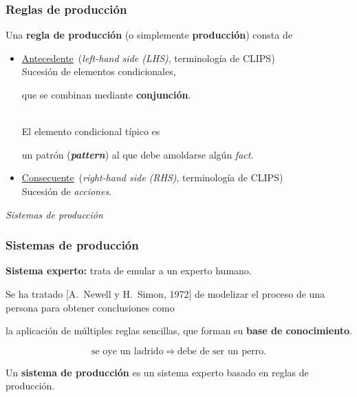 \documentclass{beamer}    %
\begin{document}
\begin{frame}
 \frametitle{Reglas de producción}

 Una {\bf regla de producción} (o simplemente {\bf
   producción}) consta de
 \begin{itemize}
 \item \underline{Antecedente}\hfill
  (\emph{left-hand side (LHS)}, terminología de CLIPS)\\[2mm]

 Sucesión de elementos condicionales,\\[1mm]
 \hfill\parbox{.85\linewidth}{que se combinan mediante {\bf
     conjunción}.}\\[2mm]

 El elemento condicional típico es\\[1mm]
 \hfill\parbox{.85\linewidth}{un patrón ({\bf \emph{pattern}})
   al que debe amoldarse algún \emph{fact}.}
 \vspace{5mm}

 \item \underline{Consecuente}\hfill
  (\emph{right-hand side (RHS)}, terminología de CLIPS)\\[2mm]

 Sucesión de \emph{acciones}.
 \end{itemize}
\end{frame}

\begin{frame}
\centerline{\emph{Sistemas de producción}}
\end{frame}

\begin{frame}
 \frametitle{Sistemas de producción}

 {\bf Sistema experto:} trata de emular a un experto humano.
 \vspace{4mm}

 Se ha tratado [{\sc A. Newell} y {\sc H. Simon}, 1972] de
 modelizar el proceso de una persona para obtener
 conclusiones como\\[2mm] \hfill\parbox{.85\linewidth}{la
   aplicación de múltiples reglas sencillas, que forman su
   {\bf base de conocimiento}.}
 \[\mbox{se oye un ladrido}
   \ \Rightarrow\ 
   \mbox{debe de ser un perro.}\]

 \pause

 Un {\bf sistema de producción} es un sistema experto
 basado en reglas de producción.
\end{frame}
\end{document}
